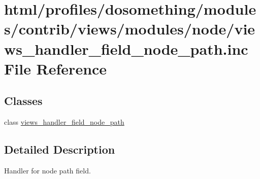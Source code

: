 \hypertarget{views__handler__field__node__path_8inc}{
\section{html/profiles/dosomething/modules/contrib/views/modules/node/views\_\-handler\_\-field\_\-node\_\-path.inc File Reference}
\label{views__handler__field__node__path_8inc}
}
\subsection*{Classes}
\begin{DoxyCompactItemize}
\item 
class \hyperlink{classviews__handler__field__node__path}{views\_\-handler\_\-field\_\-node\_\-path}
\end{DoxyCompactItemize}


\subsection{Detailed Description}
Handler for node path field. 